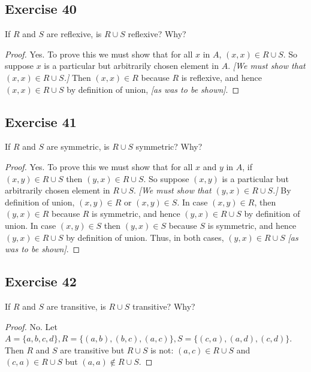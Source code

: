 \documentclass[14pt]{extarticle}
\begin{document}
\subsection{Exercise 40}
If \(R\) and \(S\) are reflexive, is \(R \cup S\) reflexive? Why?

\begin{proof}
        Yes. To prove this we must show that for all $x$ in $A$, \((x, x) \in R \cup S\). So suppose \(x\) is a particular
        but arbitrarily chosen element in \(A\). {\it [We must show that \((x, x) \in R \cup S\).]} Then \((x, x) \in R\)
        because $R$ is reflexive, and hence \((x, x) \in R \cup S\) by definition of union, {\it [as was to be shown]}.
\end{proof}

\subsection{Exercise 41}
If \(R\) and \(S\) are symmetric, is \(R \cup S\) symmetric? Why?

\begin{proof}
        Yes. To prove this we must show that for all $x$ and $y$ in $A$, if \((x, y) \in R \cup S\) then \((y, x) \in R \cup
        S\). So suppose \((x, y)\) is a particular but arbitrarily chosen element in \(R \cup S\). {\it [We must show that
                                \((y, x) \in R \cup S\).]} By definition of union, \((x, y) \in R\) or \((x, y) \in S\). In case \((x, y) \in R\), then
        \((y, x) \in R\) because $R$ is symmetric, and hence \((y, x) \in R \cup S\) by definition of union. In case \((x, y)
        \in S\) then \((y, x) \in S\) because $S$ is symmetric, and hence \((y, x) \in R \cup S\) by definition of union. Thus,
        in both cases, \((y, x) \in R \cup S\) {\it [as was to be shown]}.
\end{proof}

\subsection{Exercise 42}
If \(R\) and \(S\) are transitive, is \(R \cup S\) transitive? Why?

\begin{proof}
        No. Let \(A = \{a,b,c,d\}, R = \{(a,b),(b,c),(a,c)\}, S = \{(c,a),(a,d),(c,d)\}\). Then $R$ and $S$ are transitive but
        \(R \cup S\) is not: \((a,c) \in R \cup S\) and \((c,a) \in R \cup S\) but \((a,a) \notin R \cup S\).
\end{proof}
\end{document}
